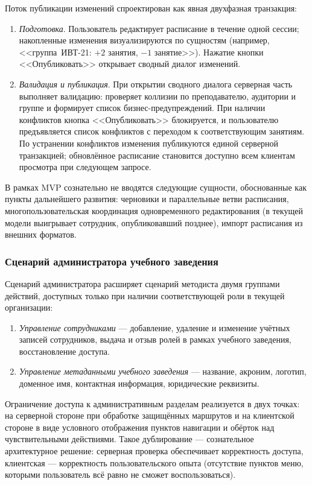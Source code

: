 Поток публикации изменений спроектирован как явная двухфазная транзакция:

\begin{enumerate}
  \item \emph{Подготовка}. Пользователь редактирует расписание в течение одной сессии; накопленные изменения визуализируются по сущностям (например, <<группа~ИВТ-21: $+2$ занятия, $-1$ занятие>>). Нажатие кнопки <<Опубликовать>> открывает сводный диалог изменений.
  \item \emph{Валидация и публикация}. При открытии сводного диалога серверная часть выполняет валидацию: проверяет коллизии по преподавателю, аудитории и группе и формирует список бизнес-предупреждений. При наличии конфликтов кнопка <<Опубликовать>> блокируется, и пользователю предъявляется список конфликтов с переходом к соответствующим занятиям. По устранении конфликтов изменения публикуются единой серверной транзакцией; обновлённое расписание становится доступно всем клиентам просмотра при следующем запросе.
\end{enumerate}

В рамках MVP сознательно не вводятся следующие сущности, обоснованные как пункты дальнейшего развития: черновики и параллельные ветви расписания, многопользовательская координация одновременного редактирования (в текущей модели выигрывает сотрудник, опубликовавший позднее), импорт расписания из внешних форматов.

\subsubsection{Сценарий администратора учебного заведения}
\label{subsubsec:admin-scenario}

Сценарий администратора расширяет сценарий методиста двумя группами действий, доступных только при наличии соответствующей роли в текущей организации:

\begin{enumerate}
  \item \emph{Управление сотрудниками} --- добавление, удаление и изменение учётных записей сотрудников, выдача и отзыв ролей в рамках учебного заведения, восстановление доступа.
  \item \emph{Управление метаданными учебного заведения} --- название, акроним, логотип, доменное имя, контактная информация, юридические реквизиты.
\end{enumerate}

Ограничение доступа к административным разделам реализуется в двух точках: на серверной стороне при обработке защищённых маршрутов и на клиентской стороне в виде условного отображения пунктов навигации и обёрток над чувствительными действиями. Такое дублирование --- сознательное архитектурное решение: серверная проверка обеспечивает корректность доступа, клиентская --- корректность пользовательского опыта (отсутствие пунктов меню, которыми пользователь всё равно не сможет воспользоваться).

